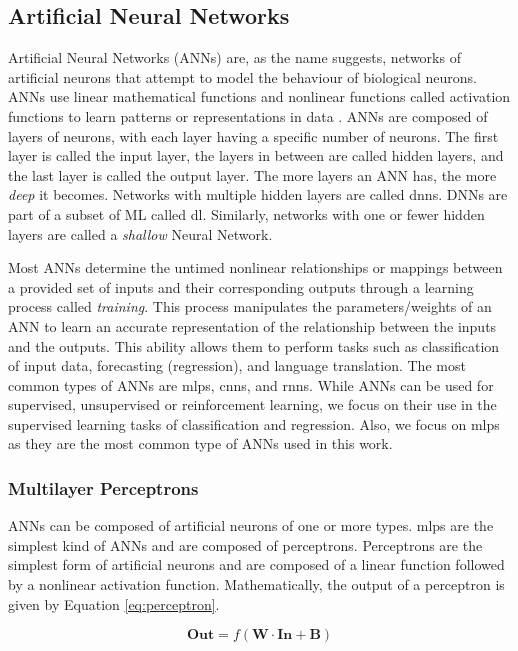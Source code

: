 \subsection{Artificial Neural Networks}
Artificial Neural Networks (ANNs) are, as the name suggests, networks of artificial neurons that attempt to model the behaviour of biological neurons. ANNs use linear mathematical functions and nonlinear functions called activation functions to learn patterns or representations in data \cite{goodfellow_deep_2016}. ANNs are composed of layers of neurons, with each layer having a specific number of neurons. The first layer is called the input layer,  the layers in between are called hidden layers, and the last layer is called the output layer. The more layers an ANN has, the more \emph{deep} it becomes. Networks with multiple hidden layers are called \glspl{dnn}. DNNs are part of a subset of ML called \gls{dl}. Similarly, networks with one or fewer hidden layers are called a \emph{shallow} Neural Network. 

Most ANNs determine the untimed nonlinear relationships or mappings between a provided set of inputs and their corresponding outputs through a learning process called \emph{training}. This process manipulates the parameters/weights of an ANN to learn an accurate representation of the relationship between the inputs and the outputs. This ability allows them to perform tasks such as classification of input data, forecasting (regression), and language translation. The most common types of ANNs are \glspl{mlp}, \glspl{cnn}, and \glspl{rnn}. While ANNs can be used for supervised, unsupervised or reinforcement learning, we focus on their use in the supervised learning tasks of classification and regression. Also, we focus on \glspl{mlp} as they are the most common type of ANNs used in this work.


\subsubsection{Multilayer Perceptrons}
ANNs can be composed of artificial neurons of one or more types. \glspl{mlp} are the simplest kind of ANNs and are composed of perceptrons. Perceptrons are the simplest form of artificial neurons and are composed of a linear function followed by a nonlinear activation function. Mathematically, the output of a perceptron is given by Equation \ref{eq:perceptron}.

\begin{equation}
 \label{eq:perceptron}
 \textbf{Out} = f(\textbf{W}\cdot\textbf{In} + \textbf{B})
\end{equation}

